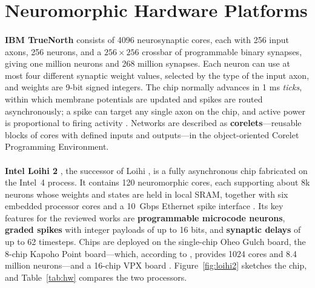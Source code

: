 \documentclass[12pt,a4paper,final]{extreport}
\begin{document}
\section{Neuromorphic Hardware Platforms}

\paragraph{} \textbf{IBM TrueNorth} \cite{merolla2014} consists of 4096 neurosynaptic cores, each with 256 input axons, 256 neurons, and a $256\times256$ crossbar of programmable binary synapses, giving one million neurons and 268 million synapses. Each neuron can use at most four different synaptic weight values, selected by the type of the input axon, and weights are 9-bit signed integers. The chip normally advances in 1 ms \emph{ticks}, within which membrane potentials are updated and spikes are routed asynchronously; a spike can target any single axon on the chip, and active power is proportional to firing activity \cite{p3}. Networks are described as \textbf{corelets}---reusable blocks of cores with defined inputs and outputs---in the object-oriented Corelet Programming Environment.

\paragraph{} \textbf{Intel Loihi 2} \cite{orchard2021}, the successor of Loihi \cite{davies2018}, is a fully asynchronous chip fabricated on the Intel~4 process. It contains 120 neuromorphic cores, each supporting about 8k neurons whose weights and states are held in local SRAM, together with six embedded processor cores and a 10~Gbps Ethernet spike interface \cite{p1,p4}. Its key features for the reviewed works are \textbf{programmable microcode neurons}, \textbf{graded spikes} with integer payloads of up to 16 bits, and \textbf{synaptic delays} of up to 62 timesteps. Chips are deployed on the single-chip Oheo Gulch board, the 8-chip Kapoho Point board---which, according to \cite{p2}, provides 1024 cores and 8.4 million neurons---and a 16-chip VPX board \cite{p4}. Figure~\ref{fig:loihi2} sketches the chip, and Table~\ref{tab:hw} compares the two processors.
\end{document}
